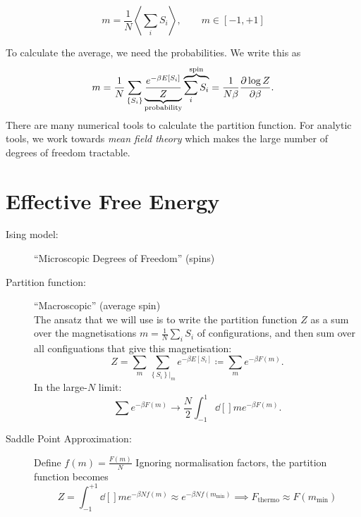 \begin{definition}
  \begin{equation}
    m = \frac{1}{N} \left\langle \sum_i S_i \right\rangle, \qquad m \in [-1, +1]
  \end{equation}
\end{definition}
To calculate the average, we need the probabilities. We write this as
\begin{equation}
  m = \frac{1}{N} \sum_{\left\{ S_i \right\}} \underbrace{\frac{e^{-\beta E[S_i]}}{Z}}_{\text{probability}} 
  \overbrace{\sum_i S_i}^{\text{spin}} = \frac{1}{N\beta} \pdv{\log Z}{\beta}.
\end{equation}
There are many numerical tools to calculate the partition function. For analytic tools, we work towards \emph{mean field theory} which makes the large number of degrees of freedom tractable.

\section{Effective Free Energy}%
\label{sec:effective_free_energy}

\begin{description}
  \item[Ising model:] ``Microscopic Degrees of Freedom'' (spins)
  \item[Partition function:] ``Macroscopic'' (average spin) \\
    The ansatz that we will use is to write the partition function $Z$ as a sum over the magnetisations $m = \frac{1}{N} \sum_i S_i$ of configurations, and then sum over all configuations that give this magnetisation:
    \begin{equation}
      Z = \sum_m \sum_{\left\{ S_i \right\} \rvert_m} e^{-\beta E[S_i]} \coloneqq \sum_m e^{-\beta F(m)}.
    \end{equation}
    In the large-$N$ limit: 
    \begin{equation}
      \sum e^{-\beta F(m)} \longrightarrow \frac{N}{2} \int_{-1}^{1} \dd[]{m} e^{-\beta F(m)}.
    \end{equation}

  \item[Saddle Point Approximation:] Define $f(m) = \frac{F(m)}{N}$
    Ignoring normalisation factors, the partition function becomes
    \begin{equation}
      Z = \int_{-1}^{+1} \dd[]{m} e^{-\beta N f(m)} \approx e^{-\beta N f(m_{\text{min}})} \implies F_{\text{thermo}} \approx F(m_{\text{min}})
    \end{equation}
\end{description}

